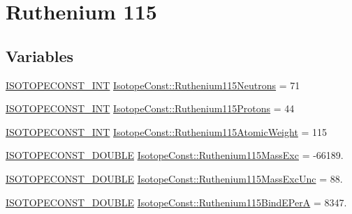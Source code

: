 \hypertarget{group___isotope_const-_ruthenium-_ru115}{}\section{Ruthenium 115}
\label{group___isotope_const-_ruthenium-_ru115}
\subsection*{Variables}
\begin{DoxyCompactItemize}
\item 
\mbox{\hyperlink{group___isotope_const-_macros_ga5f18360b3e99483a35c32d789e62621c}{I\+S\+O\+T\+O\+P\+E\+C\+O\+N\+S\+T\+\_\+\+I\+NT}} \mbox{\hyperlink{group___isotope_const-_ruthenium-_ru115_gad93bea7b089c5273dc01eb625f927c8d}{Isotope\+Const\+::\+Ruthenium115\+Neutrons}} = 71
\item 
\mbox{\hyperlink{group___isotope_const-_macros_ga5f18360b3e99483a35c32d789e62621c}{I\+S\+O\+T\+O\+P\+E\+C\+O\+N\+S\+T\+\_\+\+I\+NT}} \mbox{\hyperlink{group___isotope_const-_ruthenium-_ru115_gacef7bad76f0dcf7cef1ab2a095d853af}{Isotope\+Const\+::\+Ruthenium115\+Protons}} = 44
\item 
\mbox{\hyperlink{group___isotope_const-_macros_ga5f18360b3e99483a35c32d789e62621c}{I\+S\+O\+T\+O\+P\+E\+C\+O\+N\+S\+T\+\_\+\+I\+NT}} \mbox{\hyperlink{group___isotope_const-_ruthenium-_ru115_ga7a1996cb93cd76c329833c657f6d5aff}{Isotope\+Const\+::\+Ruthenium115\+Atomic\+Weight}} = 115
\item 
\mbox{\hyperlink{group___isotope_const-_macros_ga8f45a7272ce02c0b4c65c44636ed719a}{I\+S\+O\+T\+O\+P\+E\+C\+O\+N\+S\+T\+\_\+\+D\+O\+U\+B\+LE}} \mbox{\hyperlink{group___isotope_const-_ruthenium-_ru115_ga3eb57f449612b26ffb7ff085789e7dd9}{Isotope\+Const\+::\+Ruthenium115\+Mass\+Exc}} = -\/66189.
\item 
\mbox{\hyperlink{group___isotope_const-_macros_ga8f45a7272ce02c0b4c65c44636ed719a}{I\+S\+O\+T\+O\+P\+E\+C\+O\+N\+S\+T\+\_\+\+D\+O\+U\+B\+LE}} \mbox{\hyperlink{group___isotope_const-_ruthenium-_ru115_ga62426c5f6260a790faaca5146d3e1e94}{Isotope\+Const\+::\+Ruthenium115\+Mass\+Exc\+Unc}} = 88.
\item 
\mbox{\hyperlink{group___isotope_const-_macros_ga8f45a7272ce02c0b4c65c44636ed719a}{I\+S\+O\+T\+O\+P\+E\+C\+O\+N\+S\+T\+\_\+\+D\+O\+U\+B\+LE}} \mbox{\hyperlink{group___isotope_const-_ruthenium-_ru115_ga032049193c48b028494e271adfa7c553}{Isotope\+Const\+::\+Ruthenium115\+Bind\+E\+PerA}} = 8347.
\item 

\end{DoxyCompactItemize}
